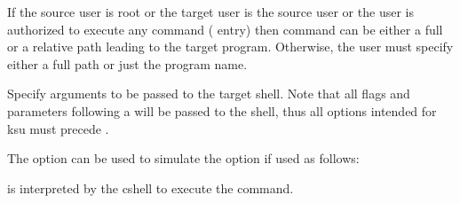 \documentclass[letterpaper,10pt,english]{sphinxmanual}
\begin{document}
\begin{description}
\sphinxAtStartPar
If the source user is root or the target user is the source user
or the user is authorized to execute any command (\sphinxcode{\sphinxupquote{*}} entry)
then command can be either a full or a relative path leading to
the target program.  Otherwise, the user must specify either a
full path or just the program name.

\sphinxAtStartPar
Specify arguments to be passed to the target shell.  Note that all
flags and parameters following \sphinxhyphen{}a will be passed to the shell,
thus all options intended for ksu must precede .

\sphinxAtStartPar
The  option can be used to simulate the  option if
used as follows:

\begin{sphinxVerbatim}[commandchars=\\\{\}]
  \PYG{p}{[} \PYG{p}{[}\PYG{p}{]}\PYG{p}{]}
\end{sphinxVerbatim}

\sphinxAtStartPar
{} is interpreted by the c\sphinxhyphen{}shell to execute the command.

\end{description}
\end{document}
